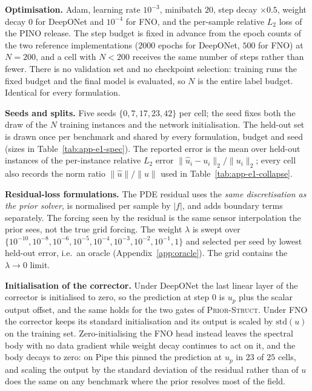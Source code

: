 \documentclass{article}
\newcommand{\armstruct}{\textsc{Prior-Struct}}
\begin{document}
\textbf{Optimisation.} Adam, learning rate $10^{-3}$, minibatch $20$, step decay $\times0.5$,
weight decay $0$ for DeepONet and $10^{-4}$ for FNO, and the per-sample relative $L_2$ loss of the
PINO release. The step budget is fixed in advance from the epoch counts of the two reference
implementations ($2000$ epochs for DeepONet, $500$ for FNO) at $N=200$, and a cell with $N<200$
receives the same number of steps rather than fewer. There is no validation set and no
checkpoint selection: training runs the fixed budget and the final model is evaluated, so $N$ is
the entire label budget. Identical for every formulation.

\textbf{Seeds and splits.} Five seeds $\{0,7,17,23,42\}$ per cell; the seed fixes both the draw of
the $N$ training instances and the network initialisation. The held-out set is drawn once per
benchmark and shared by every formulation, budget and seed (sizes in
Table~\ref{tab:app-e1-spec}). The reported error is the mean over held-out instances of the
per-instance relative $L_2$ error $\|\hat u_i - u_i\|_2/\|u_i\|_2$; every cell also records the
norm ratio $\|\hat u\|/\|u\|$ used in Table~\ref{tab:app-e1-collapse}.

\textbf{Residual-loss formulations.} The PDE residual uses the \emph{same discretisation as the
prior solver}, is normalised per sample by $|f|$, and adds boundary terms separately. The forcing
seen by the residual is the same sensor interpolation the prior sees, not the true grid forcing.
The weight $\lambda$ is swept over $\{10^{-10},10^{-8},10^{-6},10^{-5},10^{-4},10^{-3},10^{-2},
10^{-1},1\}$ and selected per seed by lowest held-out error, i.e.\ an oracle
(Appendix~\ref{app:oracle}). The grid contains the $\lambda\!\to\!0$ limit.

\textbf{Initialisation of the corrector.} Under DeepONet the last linear layer of the corrector is
initialised to zero, so the prediction at step $0$ is $u_p$ plus the scalar output offset, and the
same holds for the two gates of \armstruct. Under FNO the corrector keeps its standard
initialisation and its output is scaled by $\mathrm{std}(u)$ on the training set. Zero-initialising
the FNO head instead leaves the spectral body with no data gradient while weight decay continues to
act on it, and the body decays to zero: on Pipe this pinned the prediction at $u_p$ in $23$ of $25$
cells, and scaling the output by the standard deviation of the residual rather than of $u$ does the
same on any benchmark where the prior resolves most of the field.
\end{document}
